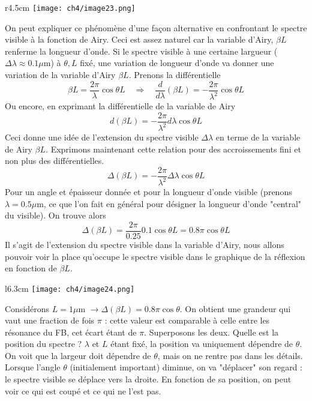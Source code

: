 	\begin{wrapfigure}[9]{r}{4.5cm}
	\vspace{-5mm}
	\texttt{[image: ch4/image23.png]}
	\end{wrapfigure}
On peut expliquer ce phénomène d'une façon alternative en confrontant le spectre visible à la 
fonction de Airy. Ceci est assez naturel car la variable d'Airy, $\beta L$ renferme la longueur 
d'onde. Si le spectre visible à une certaine largueur ($\Delta \lambda \approx 0.1\mu$m) à 
$\theta, L$ fixé, une variation de longueur d'onde va donner une variation de la variable d'Airy 
$\beta L$. Prenons la différentielle
\begin{equation}
\beta L = \frac{2\pi}{\lambda} \cos\theta L\quad\Rightarrow\quad \frac{d}{d\lambda}(\beta L) =
-\frac{2\pi}{\lambda^2}\cos\theta L
\end{equation}
Ou encore, en exprimant la différentielle de la variable de Airy
\begin{equation}
d(\beta L) = -\frac{2\pi}{\lambda^2}d\lambda\cos\theta L
\end{equation}
Ceci donne une idée de l'extension du spectre visible $\Delta \lambda$ en terme de la variable 
de Airy $\beta L$. Exprimons maintenant cette relation pour des accroissements fini et non plus 
des différentielles.
\begin{equation}
\Delta(\beta L) = -\frac{2\pi}{\lambda^2}\Delta\lambda\cos\theta L
\end{equation}
Pour un angle et épaisseur donnée et pour la longueur d'onde visible (prenons $\lambda =0.5\mu$m, 
ce que l'on fait en général pour désigner la longueur d'onde "central" du visible). On trouve alors
\begin{equation}
\Delta (\beta L) =\frac{2\pi}{0.25}0.1\cos\theta L = 0.8\pi\cos\theta L
\end{equation}
Il s'agit de l’extension du spectre visible dans la variable d'Airy, nous allons pouvoir voir 
la place qu'occupe le spectre visible dans le graphique de la réflexion en fonction de $\beta L$.\\

	\begin{wrapfigure}[11]{l}{6.3cm}
	\vspace{-5mm}
	\texttt{[image: ch4/image24.png]}
	\end{wrapfigure}
Considérons $L=1\mu$m $\rightarrow \Delta(\beta L) = 0.8\pi\cos\theta$. On obtient une grandeur 
qui vaut une fraction de fois $\pi$ : cette valeur est comparable à celle entre les résonance du FB, 
cet écart étant de $\pi$. Superposons les deux. Quelle est la position du spectre ? $\lambda$ et 
$L$ étant fixé, la position va uniquement dépendre de $\theta$.  On voit que la largeur doit dépendre 
de $\theta$, mais on ne rentre pas dans les détails. Lorsque l'angle $\theta$ (initialement important) 
diminue, on va "déplacer" son regard : le spectre visible se déplace vers la droite. En fonction de 
sa position, on peut voir ce qui est coupé et ce qui ne l'est pas.\\

